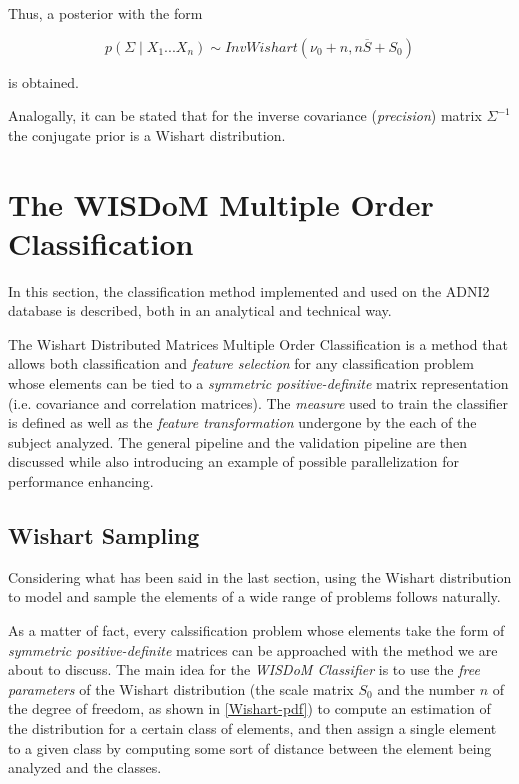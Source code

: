 \documentclass[12pt,openright,twoside,a4paper]{book}
\begin{document}
Thus, a posterior with the form

\begin{equation}
p(\Sigma\mid X_1...X_n)\sim InvWishart(\nu_0+n, n\overline{S}+S_0)
\end{equation}

is obtained.

Analogally, it can be stated that for the inverse covariance (\textit{precision}) matrix $\Sigma^{-1}$ the conjugate prior is a Wishart distribution.

\chapter{The WISDoM Multiple Order Classification}

In this section, the classification method implemented and used on the ADNI2  database is described, both in an analytical and technical way.

The Wishart Distributed Matrices Multiple Order Classification is a method that allows both classification and \textit{feature selection} for any classification problem whose elements can be tied to a \textit{symmetric positive-definite} matrix representation (i.e. covariance and correlation matrices).
The \textit{measure} used to train the classifier is defined as well as the \textit{feature transformation} undergone by the each of the subject analyzed.
The general pipeline and the validation pipeline are then discussed while also introducing an example of possible parallelization for performance enhancing.

\section{Wishart Sampling}

Considering what has been said in the last section, using the Wishart distribution to model and sample the elements of a wide range of problems follows naturally.

As a matter of fact, every calssification problem whose elements take the form of \textit{symmetric positive-definite} matrices can be approached with the method we are about to discuss.
The main idea for the \textit{WISDoM Classifier} is to use the \textit{free parameters} of the Wishart distribution (the scale matrix $S_0$ and the number $n$ of the degree of freedom, as shown in \ref{Wishart-pdf}) to compute an estimation of the distribution for a certain class of elements, and then assign a single element to a given class by computing some sort of distance between the element being analyzed and the classes.
\end{document}

